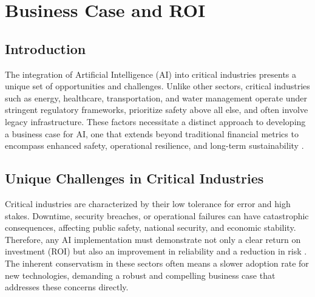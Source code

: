 \chapter{Business Case and ROI}
\section{Introduction}
The integration of Artificial Intelligence (AI) into critical industries presents a unique set of opportunities and challenges. Unlike other sectors, critical industries such as energy, healthcare, transportation, and water management operate under stringent regulatory frameworks, prioritize safety above all else, and often involve legacy infrastructure. These factors necessitate a distinct approach to developing a business case for AI, one that extends beyond traditional financial metrics to encompass enhanced safety, operational resilience, and long-term sustainability \parencite{Smith2017}.

\section{Unique Challenges in Critical Industries}
Critical industries are characterized by their low tolerance for error and high stakes. Downtime, security breaches, or operational failures can have catastrophic consequences, affecting public safety, national security, and economic stability. Therefore, any AI implementation must demonstrate not only a clear return on investment (ROI) but also an improvement in reliability and a reduction in risk \parencite{Johnson2018}. The inherent conservatism in these sectors often means a slower adoption rate for new technologies, demanding a robust and compelling business case that addresses these concerns directly.

